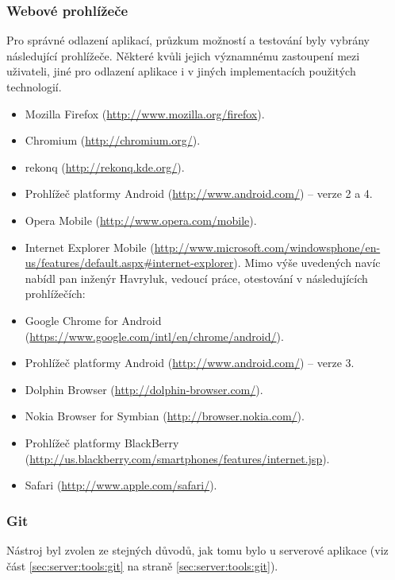 \subsubsection{Webové prohlížeče}
Pro správné odlazení aplikací, průzkum možností a testování byly vybrány následující prohlížeče. Některé kvůli jejich významnému zastoupení mezi uživateli, jiné pro odlazení aplikace i v jiných implementacích použitých technologií.
\begin{itemize}
 \item Mozilla Firefox (\url{http://www.mozilla.org/firefox}).
 \item Chromium (\url{http://chromium.org/}).
 \item rekonq (\url{http://rekonq.kde.org/}).
 \item Prohlížeč platformy Android (\url{http://www.android.com/}) -- verze 2 a 4.
 \item Opera Mobile (\url{http://www.opera.com/mobile}).
 \item Internet Explorer Mobile (\url{http://www.microsoft.com/windowsphone/en-us/features/default.aspx#internet-explorer}).
Mimo výše uvedených navíc nabídl pan inženýr Havryluk, vedoucí práce, otestování v následujících prohlížečích:
 \item Google Chrome for Android (\url{https://www.google.com/intl/en/chrome/android/}).
 \item Prohlížeč platformy Android (\url{http://www.android.com/}) -- verze 3.
 \item Dolphin Browser (\url{http://dolphin-browser.com/}).
 \item Nokia Browser for Symbian  (\url{http://browser.nokia.com/}).
 \item Prohlížeč platformy BlackBerry (\url{http://us.blackberry.com/smartphones/features/internet.jsp}).
 \item Safari (\url{http://www.apple.com/safari/}).
\end{itemize}

\subsubsection{Git}
Nástroj byl zvolen ze stejných důvodů, jak tomu bylo u serverové aplikace (viz část \ref{sec:server:tools:git} na straně \ref{sec:server:tools:git}).
